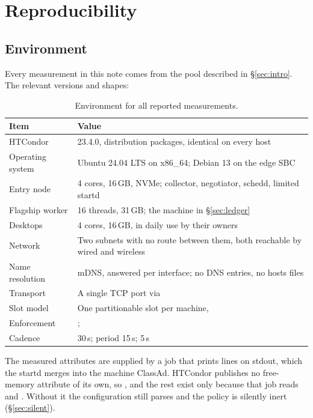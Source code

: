 \section{Reproducibility}
\label{app:repro}

\subsection{Environment}

Every measurement in this note comes from the pool described in
\S\ref{sec:intro}. The relevant versions and shapes:

\begin{table}[H]
\centering
\begin{tabularx}{\textwidth}{L{0.30\textwidth} Y}
\toprule
\textbf{Item} & \textbf{Value} \\
\midrule
HTCondor & 23.4.0, distribution packages, identical on every host \\
Operating system & Ubuntu 24.04 LTS on x86\_64; Debian 13 on the edge SBC \\
Entry node & 4 cores, 16\,GB, NVMe; collector, negotiator, schedd, limited startd \\
Flagship worker & 16 threads, 31\,GB; the machine in \S\ref{sec:ledger} \\
Desktops & 4 cores, 16\,GB, in daily use by their owners \\
Network & Two subnets with no route between them, both reachable by wired and wireless \\
Name resolution & mDNS, answered per interface; no DNS entries, no hosts files \\
Transport & A single TCP port via  \\
Slot model & One partitionable slot per machine,  \\
Enforcement & ;  \\
Cadence &  30\,s;  period 15\,s;  5\,s \\
\bottomrule
\end{tabularx}
\caption{Environment for all reported measurements.}
\end{table}

The measured attributes are supplied by a  job that prints
 lines on stdout, which the startd merges into the machine
ClassAd. HTCondor publishes no free-memory attribute of its own, so
,  and the rest exist only because that
job reads  and . Without it the
configuration still parses and the policy is silently inert
(\S\ref{sec:silent}).


